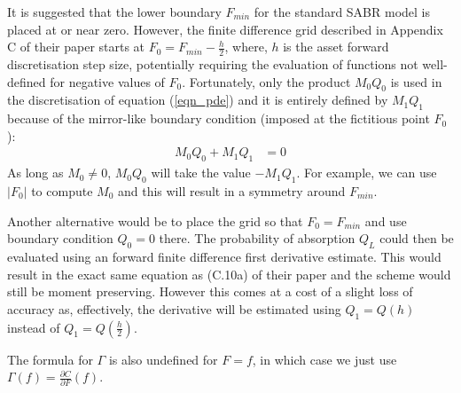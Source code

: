 \documentclass[]{rAMF2e}
\begin{document}
It is suggested that the lower boundary $F_{min}$ for the standard SABR model is placed at or near zero. However, the finite difference grid described in Appendix C of their paper starts at  $F_0 = F_{min} - \frac{h}{2}$, where, $h$ is the asset forward discretisation step size, potentially requiring the evaluation of functions not well-defined for negative values of $F_0$. Fortunately, only the product $M_0 Q_0$ is used in the discretisation of equation (\ref{eqn_pde}) and it is entirely defined by $M_1 Q_1$  because of the mirror-like boundary condition (imposed at the fictitious point $F_0$): 
\begin{align}\label{boundary_condition}
M_0 Q_0 + M_1 Q_1 &= 0
\end{align}
As long as $M_0 \neq 0$, $M_0 Q_0$ will take the value $-M_1 Q_1$. For example, we can use $|F_0|$ to compute $M_0$ and this will result in a symmetry around $F_{min}$.


Another alternative would be to place the grid so that $F_0 = F_{min}$ and use boundary condition $Q_0 = 0$ there. The probability of absorption $Q_L$ could then be evaluated using an forward finite difference first derivative estimate. This would result in the exact same equation as (C.10a) of their paper and the scheme would still be moment preserving. However this comes at a cost of a slight loss of accuracy as, effectively, the derivative will be estimated using $Q_1 = Q(h)$ instead of $Q_1 = Q(\frac{h}{2})$.

The formula for $\Gamma$ is also undefined for $F=f$, in which case we just use $\Gamma(f) = \frac{\partial C}{\partial F}(f)$.
\end{document}
